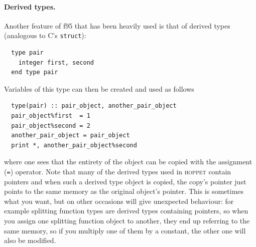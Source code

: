 \documentclass[12pt]{article}
\newcommand{\hoppet}{\textsc{hoppet}\xspace}
\begin{document}
\paragraph{Derived types.} Another feature of f95 that has been
heavily used is that of derived types (analogous to C's
\texttt{struct}):
\begin{verbatim}
  type pair
    integer first, second
  end type pair 
\end{verbatim}
Variables of this type can then be created and used as follows
\begin{verbatim}
  type(pair) :: pair_object, another_pair_object
  pair_object%first  = 1
  pair_object%second = 2
  another_pair_object = pair_object
  print *, another_pair_object%second
\end{verbatim}
where one sees that the entirety of the object can be copied with the
assignment (\texttt{=}) operator. Note that many of the derived types
used in \hoppet contain pointers and when such a derived type object
is copied, the copy's pointer just points to the same memory as the
original object's pointer. This is sometimes what you want, but on
other occasions will give unexpected behaviour: for example splitting
function types are derived types containing pointers, so when you
assign one splitting function object to another, they end up referring
to the same memory, so if you multiply one of them by a constant, the
other one will also be modified.
\end{document}
